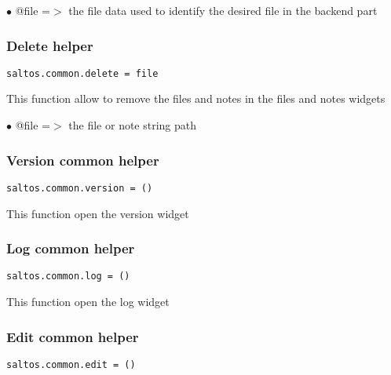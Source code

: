 \documentclass[a4paper]{article}
\begin{document}
\begin{compactitem}
\item[\color{myblue}$\bullet$] @file =$>$ the file data used to identify the desired file in the backend part
\end{compactitem}

\hypertarget{toc681}{}
\subsubsection{Delete helper}

\begin{lstlisting}
saltos.common.delete = file
\end{lstlisting}

This function allow to remove the files and notes in the files and notes widgets

\begin{compactitem}
\item[\color{myblue}$\bullet$] @file =$>$ the file or note string path
\end{compactitem}

\hypertarget{toc682}{}
\subsubsection{Version common helper}

\begin{lstlisting}
saltos.common.version = ()
\end{lstlisting}

This function open the version widget

\hypertarget{toc683}{}
\subsubsection{Log common helper}

\begin{lstlisting}
saltos.common.log = ()
\end{lstlisting}

This function open the log widget

\hypertarget{toc684}{}
\subsubsection{Edit common helper}

\begin{lstlisting}
saltos.common.edit = ()
\end{lstlisting}
\end{document}
